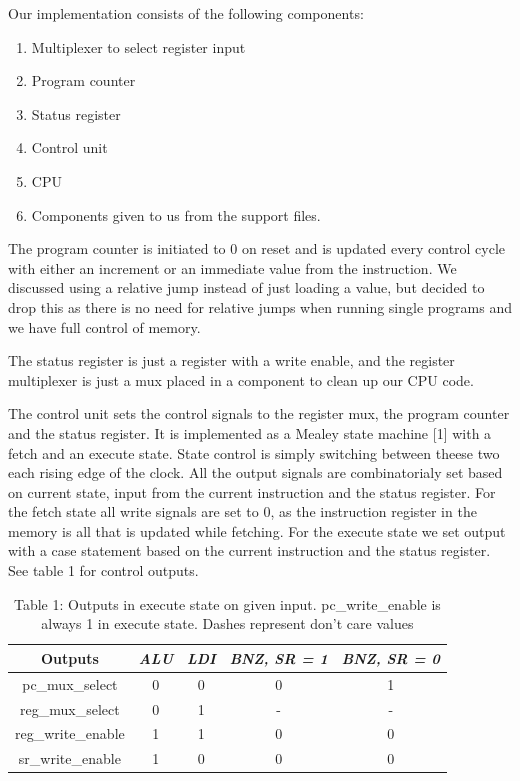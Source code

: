 \documentclass[11pt]{report}
\begin{document}
Our implementation consists of the following components:
	
\begin{enumerate}
\item Multiplexer to select register input
\item Program counter
\item Status register
\item Control unit
\item CPU
\item Components given to us from the support files.
\end{enumerate}
	
The program counter is initiated to 0 on reset and is updated every control cycle
with either an increment or an immediate value from the instruction. 
We discussed using a relative jump instead of just loading a value, 
but decided to drop this as there is no need for relative jumps when running 
single programs and we have full control of memory.
  
The status register is just a register with a write enable, and the register 
multiplexer is just a mux placed in a component to clean up our CPU code.  

The control unit sets the control signals to the register mux, the program counter 
and the status register. It is implemented as a Mealey state machine [1]
with a fetch and an execute state. State control is simply switching between theese two
each rising edge of the clock. All the output signals are combinatorialy set based on current
state, input from the current instruction and the status register. For the fetch state all
write signals are set to 0, as the instruction register in the memory is all that is updated
while fetching. For the execute state we set output with a case statement based on the current 
instruction and the status register. See table 1 for control outputs.

\begin{table}[h]
  \centering
  \begin{tabular}{|c|c|c|c|c|} \hline
    Outputs&\emph{ALU}&\emph{LDI}&\emph{BNZ, SR = 1}&\emph{BNZ, SR = 0}\\ \hline
    pc\_mux\_select&0&0&0&1  \\
    reg\_mux\_select&0&1&-&-  \\
    reg\_write\_enable&1&1&0&0  \\
    sr\_write\_enable&1&0&0&0  \\
    \hline
  \end{tabular}
  \caption{Table 1: Outputs in execute state on given input.
  pc\_write\_enable is always 1 in execute state. Dashes represent don't care values}
\end{table}
\end{document}
